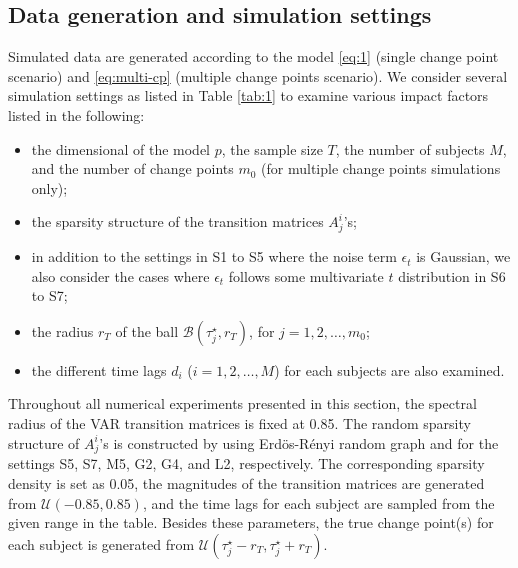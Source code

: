 \documentclass[11pt]{article}
\begin{document}
\subsection{Data generation and simulation settings}
Simulated data are generated according to the model \eqref{eq:1} (single change point scenario) and \eqref{eq:multi-cp} (multiple change points scenario). We consider several simulation settings as listed in Table \ref{tab:1} to examine various impact factors listed in the following:
\begin{itemize}
    \item[A.] the dimensional of the model $p$, the sample size $T$, the number of subjects $M$, and the number of change points $m_0$ (for multiple change points simulations only);
    \item[B.] the sparsity structure of the transition matrices $A^i_j$'s;
    \item[C.] in addition to the settings in S1 to S5 where the noise term $\epsilon_t$ is Gaussian, we also consider the cases where $\epsilon_t$ follows some multivariate $t$ distribution in S6 to S7; 
    \item[D.] the radius $r_T$ of the ball $\mathcal{B}(\tau^\star_j, r_T)$, for $j=1,2,\dots, m_0$;
    \item[E.] the different time lags $d_i$ ($i=1,2,\dots, M$) for each subjects are also examined.
\end{itemize}
Throughout all numerical experiments presented in this section, the spectral radius of the VAR transition matrices is fixed at 0.85. The random sparsity structure of $A_j^i$'s is constructed by using Erd\"{o}s-R\'{e}nyi random graph and for the settings S5, S7, M5, G2, G4, and L2, respectively. The corresponding sparsity density is set as 0.05, the magnitudes of the transition matrices are generated from $\mathcal{U}(-0.85, 0.85)$, and the time lags for each subject are sampled from the given range in the table. Besides these parameters, the true change point(s) for each subject is generated from $\mathcal{U}(\tau^\star_j-r_T, \tau^\star_j+r_T)$.
\end{document}
